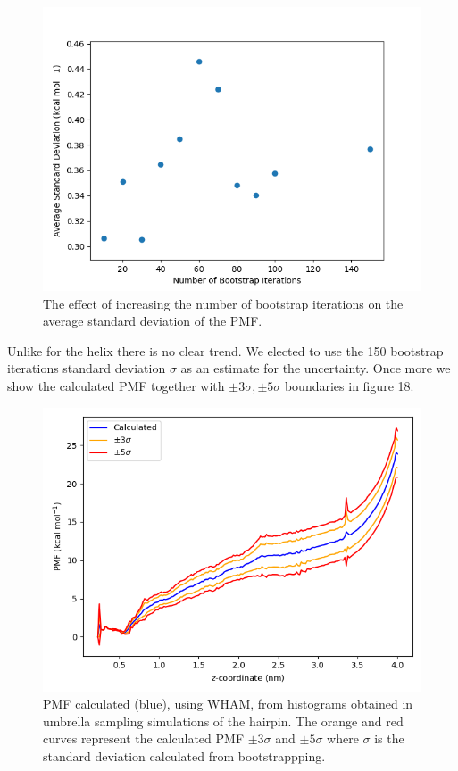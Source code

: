 \documentclass[12pt, onecolumn]{revtex4}    %
\begin{document}
\begin{figure}[h!]
\label{fig: hairboot}
\includegraphics[scale=0.5]{HairBootstrapSDev}
\caption{The effect of increasing the number of bootstrap iterations on the average standard deviation of the PMF.}
\end{figure}

Unlike for the helix there is no clear trend.  We elected to use the 150 bootstrap iterations standard deviation $\sigma$ as an estimate for the uncertainty.  Once more we show the calculated PMF together with $\pm 3\sigma, \pm 5 \sigma$ boundaries in figure 18. \\

\begin{figure}[h!]
\label{fig: hairpmf}
\includegraphics[scale=0.5]{hairPMF}
\caption{PMF calculated (blue), using WHAM, from histograms obtained in umbrella sampling simulations of the hairpin.  The orange and red curves represent  the calculated PMF $\pm 3\sigma$ and $\pm 5 \sigma$ where $\sigma$ is the standard deviation calculated from bootstrappping.}
\end{figure}
\end{document}
